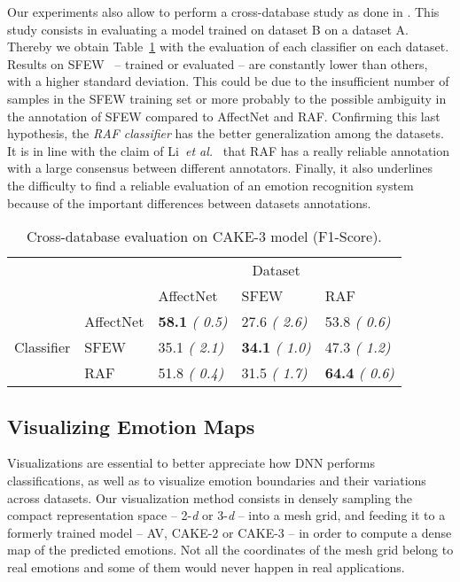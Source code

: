 \documentclass{bmvc2k}
\begin{document}
Our experiments also allow to perform a cross-database study as done in \cite{li_reliable_2017}. This study consists in evaluating a model trained on dataset B on a dataset A. Thereby we obtain Table~\ref{table:cross_f1} with the evaluation of each classifier on each dataset.
Results on SFEW~\cite{dhall_static_2011} -- trained or evaluated -- are constantly lower than others, with a higher standard deviation. This could be due to the insufficient number of samples in the SFEW training set or more probably to the possible ambiguity in the annotation of SFEW compared to AffectNet and RAF. Confirming this last hypothesis, the \textit{RAF classifier} has the better generalization among the datasets. It is in line with the claim of Li~\textit{et al.}~\cite{li_reliable_2017} that RAF has a really reliable annotation with a large consensus between different annotators. Finally, it also underlines the difficulty to find a reliable evaluation of an emotion recognition system because of the important differences between datasets annotations.

\begin{table}
\begin{tabular}{cl|l|l|l|}
\cline{3-5}
\multicolumn{1}{l}{}                                       &           & \multicolumn{3}{c|}{Dataset}                     \\ \cline{3-5} 
\multicolumn{1}{l}{}                                       &           & AffectNet         & SFEW              & RAF      \\ \hline
\multicolumn{1}{|c|}{\multirow{3}{*}{Classifier}} & AffectNet & \textbf{58.1 } \textit{( 0.5)} & 27.6 \textit{( 2.6)}          & 53.8  \textit{( 0.6)} \\ \cline{2-5} 
\multicolumn{1}{|c|}{}                                     & SFEW      & 35.1  \textit{( 2.1)}          & \textbf{34.1 } \textit{( 1.0)} & 47.3  \textit{( 1.2)} \\ \cline{2-5} 
\multicolumn{1}{|c|}{}                                     & RAF       & 51.8  \textit{( 0.4)}          & 31.5  \textit{( 1.7)}         & \textbf{64.4 } \textit{( 0.6)} \\ \hline
\end{tabular}
\caption{Cross-database evaluation on CAKE-3 model (F1-Score).}
\label{table:cross_f1}
\end{table} \subsection{Visualizing Emotion Maps}
Visualizations are essential to better appreciate how DNN performs classifications, as well as to visualize emotion boundaries and their variations across datasets. Our visualization method consists in densely sampling the compact representation space -- 2-\textit{d} or 3-\textit{d} -- into a mesh grid, and feeding it to a formerly trained model -- AV, CAKE-2 or CAKE-3 -- in order to compute a dense map of the predicted emotions. Not all the coordinates of the mesh grid belong to real emotions and some of them would never happen in real applications. 
\end{document}
